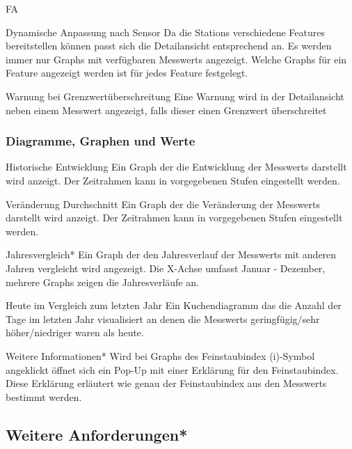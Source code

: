 \begin{Kriterien}{FA}
 \item[Dynamische Anpassung nach Sensor]
   Da die \glspl{Station} verschiedene \glspl{Feature} bereitstellen können passt sich die Detailansicht entsprechend an.
   Es werden immer nur \glspl{Graph} mit verfügbaren \glspl{Messwert} angezeigt.
   Welche \glspl{Graph} für ein \gls{Feature} angezeigt werden ist für jedes \gls{Feature} festgelegt.

 \item[Warnung bei Grenzwertüberschreitung]
  Eine Warnung wird in der Detailansicht neben einem \gls{Messwert} angezeigt, falls dieser einen Grenzwert überschreitet

 \subsubsection*{Diagramme, Graphen und Werte}

 \item[Historische Entwicklung]
   Ein \gls{Graph} der die Entwicklung der \glspl{Messwert} darstellt wird anzeigt.
   Der Zeitrahmen kann in vorgegebenen Stufen eingestellt werden.
 
 \item[Veränderung Durchschnitt]
   Ein Graph der die Veränderung der \glspl{Messwert} darstellt wird anzeigt.
   Der Zeitrahmen kann in vorgegebenen Stufen eingestellt werden.

 \item[Jahresvergleich*]
   Ein Graph der den Jahresverlauf der \glspl{Messwert} mit anderen Jahren vergleicht wird angezeigt.
   Die X-Achse umfasst Januar - Dezember, mehrere \glspl{Graph} zeigen die Jahresverläufe an.

 \item[Heute im Vergleich zum letzten Jahr]
   Ein \gls{Kuchendiagramm} das die Anzahl der Tage im letzten Jahr visualisiert an denen die \glspl{Messwert} geringfügig/sehr höher/niedriger waren als heute.

 \item[Weitere Informationen*]
   Wird bei \glspl{Graph} des \gls{Feinstaubindex} (i)-Symbol angeklickt öffnet sich ein \gls{Pop-Up} mit einer Erklärung für den \gls{Feinstaubindex}.
   Diese Erklärung erläutert wie genau der \gls{Feinstaubindex} aus den \glspl{Messwert} bestimmt werden.

\subsection{Weitere Anforderungen*}


\end{Kriterien}
